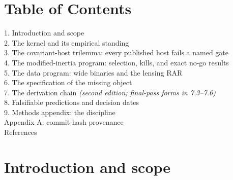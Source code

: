 \documentclass[11pt,a4paper]{article}
\begin{document}
\begin{abstract}
\textbf{self-consistent with X2} (active $\ne$ anti-damped: a stable, causal, Cauchy--Schwarz-violating window provably exists, ruling out incompatibility), a saturated-gain construction tames the runaway and \textbf{predicts the fold's momentum scale} $k_* \sim (c_\chi/\sqrt{a_0})H$ from banked constants; and the last forcing candidate --- a genuine static-patch SL(2,R)/Tomita--Takesaki modular symmetry of the Gibbons--Hawking state --- is found to \textbf{permit but not force} the gain shape (a scale-free dilation cannot pin a weight-$(-1)$ ratio onto a scale-decoupled target). The verdict is precise and honest: \textbf{the fourth-root fold mechanism is buildable, X2-compatible, and scale-predicting, but not \emph{forced} by the banked machinery} --- its delivery requires one named new-physics input (a $c_\chi\leftrightarrow H$ scale-lock or a single-scale active k-resonance), not a further calculation on existing structure. The boundary holds, sharper than ever: Z underived, the generator's forcing input named-but-unbanked, the quantum gate unmoved.
\end{abstract}

\section*{Table of Contents}

\begin{flushleft}
1. Introduction and scope \\
2. The kernel and its empirical standing \\
3. The covariant-host trilemma: every published host fails a named gate \\
4. The modified-inertia program: selection, kills, and exact no-go results \\
5. The data program: wide binaries and the lensing RAR \\
6. The specification of the missing object \\
7. The derivation chain \emph{(second edition; final-pass forms in 7.3--7.6)} \\
8. Falsifiable predictions and decision dates \\
9. Methods appendix: the discipline \\
Appendix A: commit-hash provenance \\
References \\
\end{flushleft}

\section{Introduction and scope}
\end{document}

